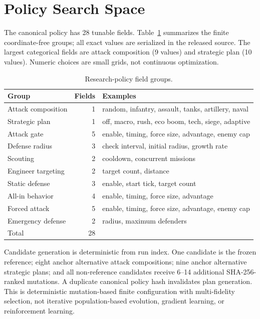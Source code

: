 \section{Policy Search Space}

The canonical policy has 28 tunable fields. Table~\ref{tab:supp-space}
summarizes the finite coordinate-free groups; all exact values are serialized
in the released source. The largest categorical fields are attack composition
(9 values) and strategic plan (10 values). Numeric choices are small grids,
not continuous optimization.

\begin{table}[ht]
\centering
\caption{Research-policy field groups.}
\label{tab:supp-space}
\small
\begin{tabular}{@{}lrl@{}}
\toprule
Group & Fields & Examples \\
\midrule
Attack composition & 1 & random, infantry, assault, tanks, artillery, naval \\
Strategic plan & 1 & off, macro, rush, eco boom, tech, siege, adaptive \\
Attack gate & 5 & enable, timing, force size, advantage, enemy cap \\
Defense radius & 3 & check interval, initial radius, growth rate \\
Scouting & 2 & cooldown, concurrent missions \\
Engineer targeting & 2 & target count, distance \\
Static defense & 3 & enable, start tick, target count \\
All-in behavior & 4 & enable, timing, force size, advantage \\
Forced attack & 5 & enable, timing, force size, advantage, enemy cap \\
Emergency defense & 2 & radius, maximum defenders \\
\midrule
Total & 28 & \\
\bottomrule
\end{tabular}
\end{table}

Candidate generation is deterministic from run index. One candidate is the
frozen reference; eight anchor alternative attack compositions; nine anchor
alternative strategic plans; and all non-reference candidates receive 6--14 additional
SHA-256-ranked mutations. A duplicate canonical policy hash invalidates plan
generation. This is deterministic mutation-based finite configuration with
multi-fidelity selection, not iterative population-based evolution, gradient
learning, or reinforcement learning.

